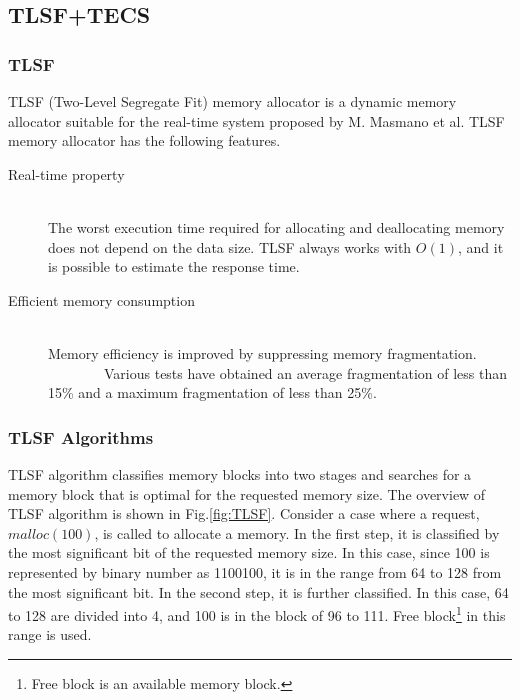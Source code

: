 \documentclass[JIP]{ipsj_v2/UTF8/ipsj}
\begin{document}
\subsection{TLSF+TECS}
\label{sec:TLSF+TECS}

\subsubsection{TLSF}

TLSF (Two-Level Segregate Fit) memory allocator\cite{par:TLSF}\cite{url:TLSF} is a dynamic memory allocator suitable for the real-time system proposed by M. Masmano et al.
TLSF memory allocator has the following features.
\begin{description}
    \item[Real-time property]\mbox{}\\
        The worst execution time required for allocating and deallocating memory does not depend on the data size.
        TLSF always works with $O(1)$, and it is possible to estimate the response time.
    \item[Efficient memory consumption]\mbox{}\\
        Memory efficiency is improved by suppressing memory fragmentation.
        Various tests have obtained an average fragmentation of less than 15\% and a maximum fragmentation of less than 25\%.
\end{description}


\subsubsection{TLSF Algorithms}

TLSF algorithm classifies memory blocks into two stages and searches for a memory block that is optimal for the requested memory size.
The overview of TLSF algorithm is shown in Fig.\ref{fig:TLSF}.
Consider a case where a request, $malloc(100)$, is called to allocate a memory.
In the first step, it is classified by the most significant bit of the requested memory size.
In this case, since 100 is represented by binary number as 1100100, it is in the range from 64 to 128 from the most significant bit.
In the second step, it is further classified.
In this case, 64 to 128 are divided into 4, and 100 is in the block of 96 to 111.
Free block\footnote{Free block is an available memory block.} in this range is used.
\end{document}

